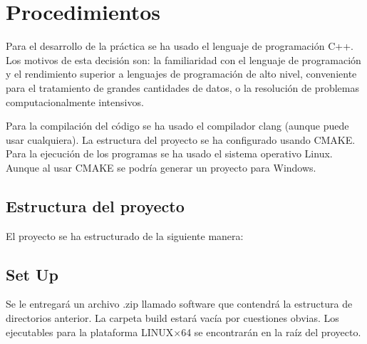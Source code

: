 \documentclass[a4paper]{report}
\begin{document}
\section{Procedimientos}

Para el desarrollo de la práctica se ha usado el lenguaje de programación C++. Los motivos de esta decisión son: la familiaridad con el lenguaje de programación y el rendimiento superior a lenguajes de programación de alto nivel, conveniente para el tratamiento de grandes cantidades de datos, o la resolución de problemas computacionalmente intensivos.

Para la compilación del código se ha usado el compilador clang (aunque puede usar cualquiera). La estructura del proyecto se ha configurado usando CMAKE. Para la ejecución de los programas se ha usado el sistema operativo Linux. Aunque al usar CMAKE se podría generar un proyecto para Windows.

\subsection{Estructura del proyecto}

El proyecto se ha estructurado de la siguiente manera:




\subsection{Set Up} \label{subsec:set-up}

Se le entregará un archivo .zip llamado software que contendrá la estructura de directorios anterior. La carpeta build estará vacía por cuestiones obvias. Los ejecutables para la plataforma LINUX$\times$64 se encontrarán en la raíz del proyecto.
\end{document}
